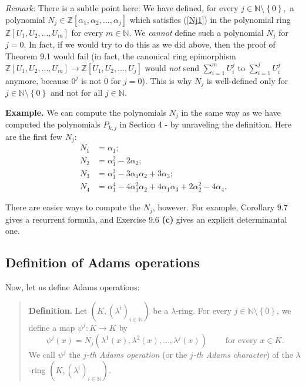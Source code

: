 \documentclass[numbers=enddot,12pt,final,onecolumn,notitlepage]{scrartcl}%
\begin{document}
\textit{Remark:} There is a subtle point here: We have defined, for every
$j\in\mathbb{N}\setminus\left\{  0\right\}  ,$ a polynomial $N_{j}%
\in\mathbb{Z}\left[  \alpha_{1},\alpha_{2},...,\alpha_{j}\right]  $ which
satisfies (\ref{Nj1}) in the polynomial ring $\mathbb{Z}\left[  U_{1}%
,U_{2},...,U_{m}\right]  $ for every $m\in\mathbb{N}$. We \textit{cannot}
define such a polynomial $N_{j}$ for $j=0$. In fact, if we would try to do
this as we did above, then the proof of Theorem 9.1 would fail (in fact, the
canonical ring epimorphism $\mathbb{Z}\left[  U_{1},U_{2},...,U_{m}\right]
\rightarrow\mathbb{Z}\left[  U_{1},U_{2},...,U_{j}\right]  $ would
\textit{not} send $\sum\limits_{i=1}^{m}U_{i}^{j}$ to $\sum\limits_{i=1}%
^{j}U_{i}^{j}$ anymore, because $0^{j}$ is not $0$ for $j=0$). This is why
$N_{j}$ is well-defined only for $j\in\mathbb{N}\setminus\left\{  0\right\}  $
and not for all $j\in\mathbb{N}$.

\textbf{Example.} We can compute the polynomials $N_{j}$ in the same way as we
have computed the polynomials $P_{k,j}$ in Section 4 - by unraveling the
definition. Here are the first few $N_{j}$:%
\begin{align*}
N_{1}  &  =\alpha_{1};\\
N_{2}  &  =\alpha_{1}^{2}-2\alpha_{2};\\
N_{3}  &  =\alpha_{1}^{3}-3\alpha_{1}\alpha_{2}+3\alpha_{3};\\
N_{4}  &  =\alpha_{1}^{4}-4\alpha_{1}^{2}\alpha_{2}+4\alpha_{1}\alpha
_{3}+2\alpha_{2}^{2}-4\alpha_{4}.
\end{align*}


There are easier ways to compute the $N_{j}$, however. For example, Corollary
9.7 gives a recurrent formula, and Exercise 9.6 \textbf{(c)} gives an explicit
determinantal one.

\subsection{Definition of Adams operations}

Now, let us define Adams operations:

\begin{quote}
\textbf{Definition.} Let $\left(  K,\left(  \lambda^{i}\right)  _{i\in
\mathbb{N}}\right)  $ be a $\lambda$-ring. For every $j\in\mathbb{N}%
\setminus\left\{  0\right\}  $, we define a map $\psi^{j}:K\rightarrow K$ by%
\begin{equation}
\psi^{j}\left(  x\right)  =N_{j}\left(  \lambda^{1}\left(  x\right)
,\lambda^{2}\left(  x\right)  ,...,\lambda^{j}\left(  x\right)  \right)
\ \ \ \ \ \ \ \ \ \ \text{for every }x\in K. \label{PsiDef}%
\end{equation}
We call $\psi^{j}$ the $j$\textit{-th Adams operation} (or the $j$\textit{-th
Adams character}) of the $\lambda$-ring $\left(  K,\left(  \lambda^{i}\right)
_{i\in\mathbb{N}}\right)  $.
\end{quote}
\end{document}
